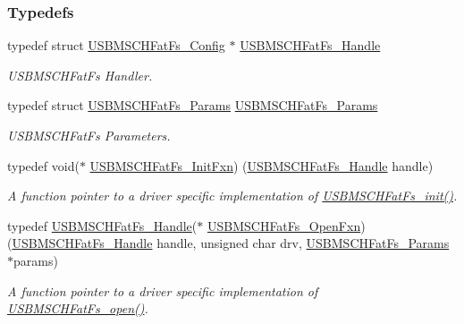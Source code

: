 \subsubsection*{Typedefs}
\begin{DoxyCompactItemize}
\item 
typedef struct \hyperlink{struct_u_s_b_m_s_c_h_fat_fs___config}{U\+S\+B\+M\+S\+C\+H\+Fat\+Fs\+\_\+\+Config} $\ast$ \hyperlink{_u_s_b_m_s_c_h_fat_fs_8h_ae35f957205bbddee73fb052b33b1719b}{U\+S\+B\+M\+S\+C\+H\+Fat\+Fs\+\_\+\+Handle}
\begin{DoxyCompactList}\small\item\em U\+S\+B\+M\+S\+C\+H\+Fat\+Fs Handler. \end{DoxyCompactList}\item 
typedef struct \hyperlink{struct_u_s_b_m_s_c_h_fat_fs___params}{U\+S\+B\+M\+S\+C\+H\+Fat\+Fs\+\_\+\+Params} \hyperlink{_u_s_b_m_s_c_h_fat_fs_8h_a06f74db1fc3ff6554070ee18b255b6f2}{U\+S\+B\+M\+S\+C\+H\+Fat\+Fs\+\_\+\+Params}
\begin{DoxyCompactList}\small\item\em U\+S\+B\+M\+S\+C\+H\+Fat\+Fs Parameters. \end{DoxyCompactList}\item 
typedef void($\ast$ \hyperlink{_u_s_b_m_s_c_h_fat_fs_8h_a2909390706605acd0972b1d77aa449e5}{U\+S\+B\+M\+S\+C\+H\+Fat\+Fs\+\_\+\+Init\+Fxn}) (\hyperlink{_u_s_b_m_s_c_h_fat_fs_8h_ae35f957205bbddee73fb052b33b1719b}{U\+S\+B\+M\+S\+C\+H\+Fat\+Fs\+\_\+\+Handle} handle)
\begin{DoxyCompactList}\small\item\em A function pointer to a driver specific implementation of \hyperlink{_u_s_b_m_s_c_h_fat_fs_8h_a70cc0939d4a838e87e3bb4742dae442e}{U\+S\+B\+M\+S\+C\+H\+Fat\+Fs\+\_\+init()}. \end{DoxyCompactList}\item 
typedef \hyperlink{_u_s_b_m_s_c_h_fat_fs_8h_ae35f957205bbddee73fb052b33b1719b}{U\+S\+B\+M\+S\+C\+H\+Fat\+Fs\+\_\+\+Handle}($\ast$ \hyperlink{_u_s_b_m_s_c_h_fat_fs_8h_ae4916284bc1646118c40574df42a4bc8}{U\+S\+B\+M\+S\+C\+H\+Fat\+Fs\+\_\+\+Open\+Fxn}) (\hyperlink{_u_s_b_m_s_c_h_fat_fs_8h_ae35f957205bbddee73fb052b33b1719b}{U\+S\+B\+M\+S\+C\+H\+Fat\+Fs\+\_\+\+Handle} handle, unsigned char drv, \hyperlink{struct_u_s_b_m_s_c_h_fat_fs___params}{U\+S\+B\+M\+S\+C\+H\+Fat\+Fs\+\_\+\+Params} $\ast$params)
\begin{DoxyCompactList}\small\item\em A function pointer to a driver specific implementation of \hyperlink{_u_s_b_m_s_c_h_fat_fs_8h_a64956f1bd732672e4cd5592a4fef4a09}{U\+S\+B\+M\+S\+C\+H\+Fat\+Fs\+\_\+open()}. \end{DoxyCompactList}\item 

\end{DoxyCompactItemize}

